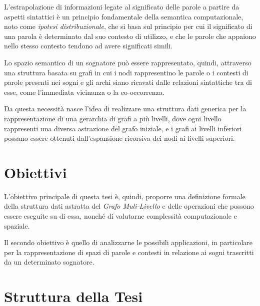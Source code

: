 L'estrapolazione di informazioni legate al significato delle parole a partire da aspetti sintattici \`e un
principio fondamentale della semantica computazionale, noto come \textit{ipotesi distribuzionale}, che si basa sul
principio per cui il significato di una parola \`e determinato dal suo contesto di utilizzo, e che le parole che
appaiono nello stesso contesto tendono ad avere significati simili.\newline

Lo spazio semantico di un sognatore pu\`o essere rappresentato, quindi, attraverso una struttura basata su grafi in cui
i nodi rappresentino le parole o i contesti di parole presenti nei sogni e gli archi siano ricavati dalle relazioni
sintattiche tra di esse, come l'immediata vicinanza o la co-occorrenza. \newline

Da questa necessit\`a nasce l'idea di realizzare una struttura dati generica per la rappresentazione di una
gerarchia di grafi a pi\`u livelli, dove ogni livello rappresenti una diversa astrazione del grafo iniziale, e i
grafi ai livelli inferiori possano essere ottenuti dall'espansione ricorsiva dei nodi ai livelli superiori. \newline

\section{Obiettivi}
L'obiettivo principale di questa tesi \`e, quindi, proporre una definizione formale della struttura dati astratta del
\textit{Grafo Muli-Livello} e delle operazioni che possono essere eseguite su di essa, nonch\'e di valutarne
complessit\`a computazionale e spaziale. \newline

Il secondo obiettivo \`e quello di analizzarne le possibili applicazioni, in particolare per la
rappresentazione di spazi di parole e contesti in relazione ai sogni trascritti da un determinato sognatore. \newline

\section{Struttura della Tesi}

